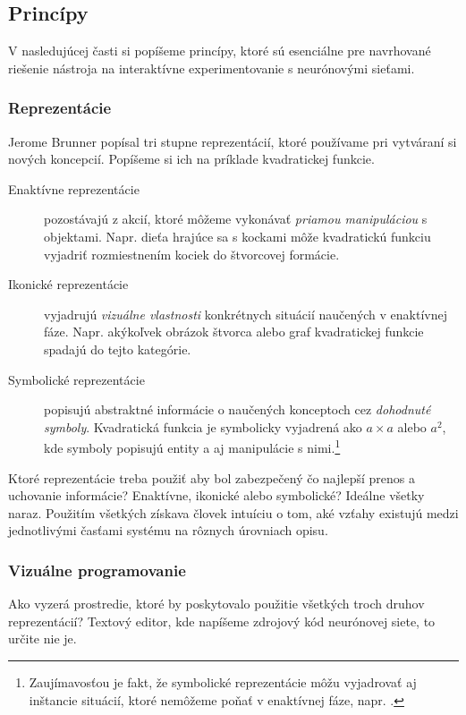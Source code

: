 \subsection{Princípy}

V nasledujúcej časti si popíšeme princípy, ktoré sú esenciálne pre navrhované riešenie nástroja na interaktívne experimentovanie s neurónovými sieťami.

\subsubsection{Reprezentácie}

Jerome Brunner popísal tri stupne reprezentácií, ktoré používame pri vytváraní si nových koncepcií.\autocite{Bruner1966} Popíšeme si ich na príklade kvadratickej funkcie.
\begin{description}
  \item[Enaktívne reprezentácie] pozostávajú z akcií, ktoré môžeme vykonávať \emph{priamou manipuláciou} s objektami. Napr. dieťa hrajúce sa s kockami môže kvadratickú funkciu vyjadriť rozmiestnením kociek do štvorcovej formácie.
  \item[Ikonické reprezentácie] vyjadrujú \emph{vizuálne vlastnosti} konkrétnych situácií naučených v enaktívnej fáze. Napr. akýkoľvek obrázok štvorca alebo graf kvadratickej funkcie spadajú do tejto kategórie.
  \item[Symbolické reprezentácie] popisujú abstraktné informácie o naučených konceptoch cez \emph{dohodnuté symboly}. Kvadratická funkcia je symbolicky vyjadrená ako $a \times a$ alebo $a^2$, kde symboly popisujú entity a aj manipulácie s nimi.\footnote{Zaujímavosťou je fakt, že symbolické reprezentácie môžu vyjadrovať aj inštancie situácií, ktoré nemôžeme poňať v enaktívnej fáze, napr. .}
\end{description}

Ktoré reprezentácie treba použiť aby bol zabezpečený čo najlepší prenos a uchovanie informácie? Enaktívne, ikonické alebo symbolické? Ideálne všetky naraz. Použitím všetkých získava človek intuíciu o tom, aké vzťahy existujú medzi jednotlivými časťami systému na rôznych úrovniach opisu.

\subsubsection{Vizuálne programovanie}

Ako vyzerá prostredie, ktoré by poskytovalo použitie všetkých troch druhov reprezentácií? Textový editor, kde napíšeme zdrojový kód neurónovej siete, to určite nie je.


